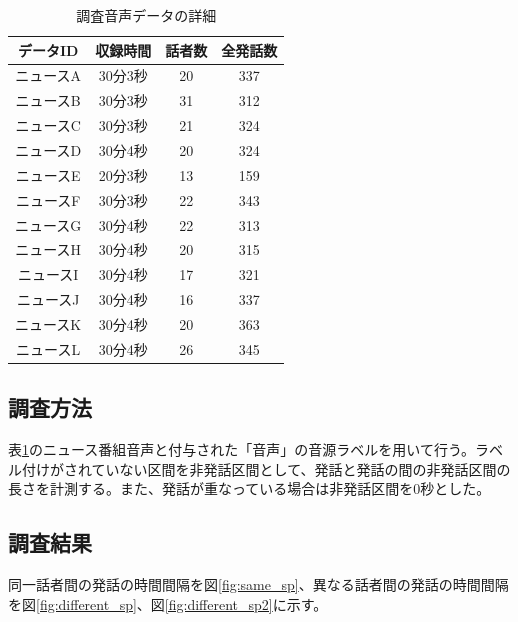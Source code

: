 \begin{table}[H]
  \begin{center}
    \caption{調査音声データの詳細　\label{table:train_detail}}
    \begin{tabular}{|c||c|c|c|} \hline
      データID & 収録時間 & 話者数 & 全発話数 \\ \hline
      ニュースA & 30分3秒 & 20 & 337 \\ \hline
      ニュースB & 30分3秒 & 31 & 312\\ \hline
      ニュースC & 30分3秒 & 21 & 324 \\ \hline
      ニュースD & 30分4秒 & 20 & 324\\ \hline
      ニュースE & 20分3秒 & 13 & 159\\ \hline
      ニュースF & 30分3秒 & 22 & 343\\ \hline
      ニュースG & 30分4秒 & 22 & 313\\ \hline
      ニュースH & 30分4秒 & 20 & 315\\ \hline
      ニュースI & 30分4秒 & 17 & 321\\ \hline
      ニュースJ & 30分4秒 & 16 & 337\\ \hline
      ニュースK & 30分4秒 & 20 & 363\\ \hline
      ニュースL & 30分4秒 & 26 & 345\\ \hline
    \end{tabular}
  \end{center}
\end{table}

\subsection{調査方法}
表\ref{table:train_detail}のニュース番組音声と付与された「音声」の音源ラベルを用いて行う。ラベル付けがされていない区間を非発話区間として、発話と発話の間の非発話区間の長さを計測する。また、発話が重なっている場合は非発話区間を0秒とした。

\subsection{調査結果}
同一話者間の発話の時間間隔を図\ref{fig:same_sp}、異なる話者間の発話の時間間隔を図\ref{fig:different_sp}、図\ref{fig:different_sp2}に示す。

